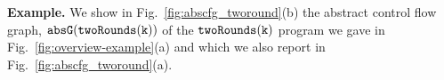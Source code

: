 \textbf{Example.}
We show in Fig.~\ref{fig:abscfg_tworound}(b) the  abstract control flow graph, $\mathtt{abs}{\mathtt{G}}(\mathtt{twoRounds(k)})$ of the $\mathtt{twoRounds(k)}$ program we gave in  Fig.~\ref{fig:overview-example}(a) and which we also report in  Fig.~\ref{fig:abscfg_tworound}(a).

%

